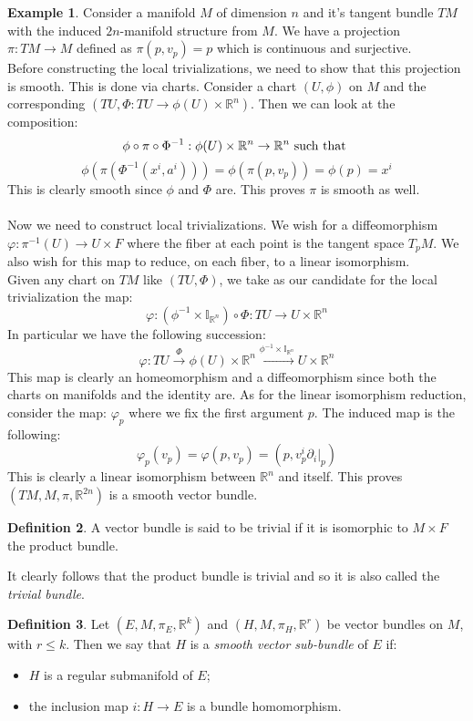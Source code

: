 \documentclass[12pt,a4paper]{report}
\theoremstyle{definition}
\newtheorem{Def}{Definition}[chapter]
\theoremstyle{Theorem}
\theoremstyle{definition}
\newtheorem{Ex}[Def]{Example}
\theoremstyle{definition}
\begin{document}
	\begin{Ex}
		Consider a manifold $M$ of dimension $n$ and it's tangent bundle $TM$ with the induced $2n$-manifold structure from $M$. We have a projection $\pi:TM\rightarrow M$ defined as $\pi(p,v_p)=p$ which is continuous and surjective. 
		\\
		Before constructing the local trivializations, we need to show that this projection is smooth. This is done via charts. Consider a chart $(U,\phi)$ on $M$ and the corresponding $(TU,\Phi:TU\rightarrow \phi(U)\times \mathbb{R}^n)$. Then we can look at the composition:
		$$\phi\circ \pi\circ \Phi^{-1}:\phi(U)\times \mathbb{R}^n\rightarrow \mathbb{R}^n \hbox{ such that }$$ 
		$$\phi(\pi(\Phi^{-1}(x^i,a^i)))=\phi(\pi(p,v_p))=\phi(p)=x^i$$
		This is clearly smooth since $\phi$ and $\Phi$ are. This proves $\pi$ is smooth as well.\\
		\\
		Now we need to construct local trivializations. We wish for a diffeomorphism $\varphi:\pi^{-1}(U)\rightarrow U\times F$ where the fiber at each point is the tangent space $T_pM$. We also wish for this map to reduce, on each fiber, to a linear isomorphism.\\
		Given any chart on $TM$ like $(TU,\Phi)$, we take as our candidate for the local trivialization the map: 
		$$\varphi:(\phi^{-1}\times \mathbb{I}_{\mathbb{R}^n})\circ \Phi:TU\rightarrow U\times \mathbb{R}^n$$
		In particular we have the following succession:
		$$\varphi:TU\xrightarrow{\text{$\Phi$}} \phi(U)\times \mathbb{R}^n\xrightarrow{\text{$\phi^{-1}\times \mathbb{I}_{\mathbb{R}^n}$}}U\times \mathbb{R}^n$$
		This map is clearly an homeomorphism and a diffeomorphism since both the charts on manifolds and the identity are. As for the linear isomorphism reduction, consider the map:
		$\varphi_p$ where we fix the first argument $p$. The induced map is the following:
		$$\varphi_p(v_p)=\varphi(p,v_p)=(p,v^i_p\partial_i|_p)$$
		This is clearly a linear isomorphism between $\mathbb{R}^n$ and itself. This proves $(TM,M,\pi,\mathbb{R}^{2n})$ is a smooth vector bundle.
	\end{Ex}
	\begin{Def}\label{Def_5.3}
		A vector bundle is said to be trivial if it is isomorphic to $M\times F$ the product bundle.
	\end{Def}
	It clearly follows that the product bundle is trivial and so it is also called the \textit{trivial bundle}.
	\begin{Def}
		Let $(E,M,\pi_E,\mathbb{R}^k)$ and $(H,M,\pi_H,\mathbb{R}^r)$ be vector bundles on $M$, with $r\leq k$. Then we say that $H$ is a \textit{smooth vector sub-bundle} of $E$ if:
		\begin{itemize}
			\item $H$ is a regular submanifold of $E$;
			\item the inclusion map $i:H\rightarrow E$ is a bundle homomorphism.
		\end{itemize}
	\end{Def}
\end{document}
